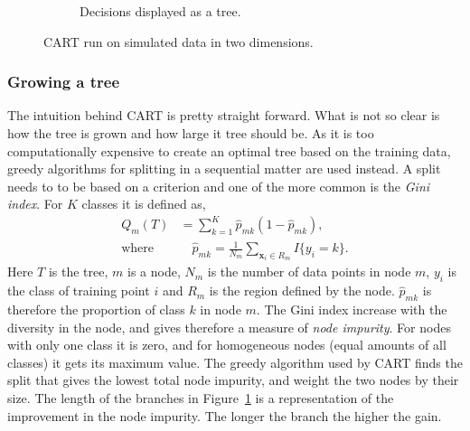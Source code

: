 \begin{figure}[h!]
\begin{subfigure}[b]{0.48\textwidth}
    \caption{Decisions displayed as a tree.}
    \label{fig:cartTree1}
  \end{subfigure}
  \vspace{1\baselineskip}
  \caption{CART run on simulated data in two dimensions. }
  \label{fig:cart}
\end{figure}
%
\subsubsection{Growing a tree}
\label{sub:Growing a tree}
The intuition behind CART is pretty straight forward. What is not so clear is how the tree is grown and how large it tree should be. As it is too computationally expensive to create an optimal tree based on the training data, greedy algorithms for splitting in a sequential matter are used instead. A split needs to to be based on a criterion and one of the more common is the \textit{Gini index}. For $K$ classes it is defined as,
\begin{align}
  Q_m(T) &= \sum^{K}_{k=1} \hat{p}_{mk} (1 - \hat{p}_{mk}),  \\ 
  \label{eq:pmk} 
  \text{where}& \quad \hat{p}_{mk} = \frac{1}{N_m} \sum_{\mathbf{x}_i \in R_m} I\{y_i = k\}.
\end{align}
Here $T$ is the tree, $m$ is a node, $N_m$ is the number of data points in node $m$, $y_i$ is the class of training point $i$ and $R_m$ is the region defined by the node.
$\hat{p}_{mk}$ is therefore the proportion of class $k$ in node $m$.
The Gini index increase with the diversity in the node, and gives therefore a measure of \textit{node impurity}. For nodes with only one class it is zero, and for homogeneous nodes (equal amounts of all classes) it gets its maximum value. The greedy algorithm used by CART finds the split that gives the lowest total node impurity, and weight the two nodes by their size.  
The length of the branches in Figure~\ref{fig:cartTree1} is a representation of the improvement in the node impurity. The longer the branch the higher the gain.

